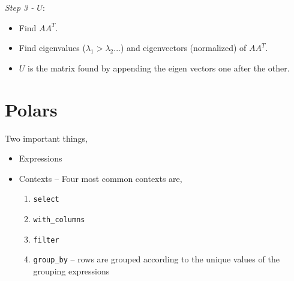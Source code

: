 \emph{Step 3 - $U$}:
\begin{itemize}
    \item Find $AA^T$.
    \item Find eigenvalues ($\lambda_1 > \lambda_2 ...$) and
        eigenvectors (normalized) of $AA^T$.
    \item $U$ is the matrix found by appending the eigen vectors one after
        the other.
\end{itemize}


\section{Polars}
Two important things,
\begin{itemize}
    \item Expressions
    \item Contexts -- Four most common contexts are,
        \begin{enumerate}
            \item \verb|select|
            \item \verb|with_columns|
            \item \verb|filter|
            \item \verb|group_by| -- rows are grouped according to the unique values of the grouping expressions
        \end{enumerate}
\end{itemize}


